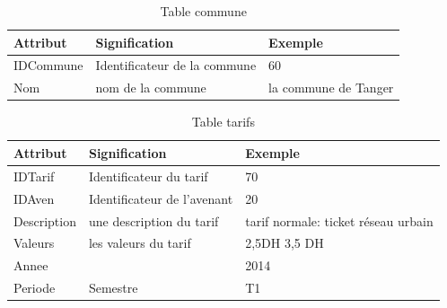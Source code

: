 \documentclass[a4paper]{report}
\begin{document}
\begin{doublespace}
	\begin{table}[H]
		\begin{center}
			\begin{tabularx}{17.5cm}{|X|X|X|}
				\hline
				\textbf{Attribut} & \textbf{Signification}       &
				\textbf{Exemple}                                                        \\
				\hline
				IDCommune         & Identificateur de la commune & 60                   \\
				\hline
				Nom               & nom de la commune            & la commune de Tanger \\
				\hline
			\end{tabularx}
			\caption{Table commune}
		\end{center}
	\end{table}

	\begin{table}[H]
		\begin{center}
			\begin{tabularx}{17.5cm}{|X|X|X|}
				\hline
				\textbf{Attribut} & \textbf{Signification}      &
				\textbf{Exemple}                                                        \\
				\hline
				IDTarif           & Identificateur du tarif     & 70                    \\
				\hline
				IDAven            & Identificateur de l'avenant & 20                    \\
				\hline
				Description       & une description du tarif    & tarif normale: ticket
				réseau urbain                                                           \\
				\hline
				Valeurs           & les valeurs du tarif        & 2,5DH 3,5 DH          \\
				\hline
				Annee             &                             & 2014                  \\
				\hline
				Periode           & Semestre                    & T1                    \\
				\hline
			\end{tabularx}
			\caption{Table tarifs}
		\end{center}
	\end{table}


\end{doublespace}
\end{document}
